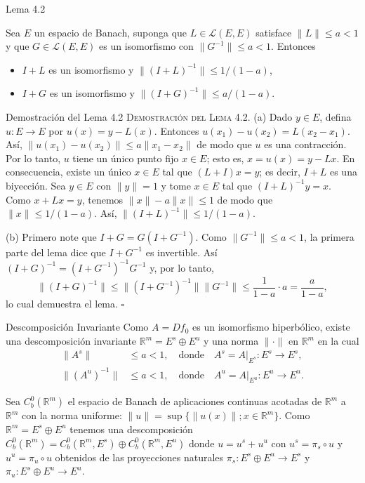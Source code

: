 \documentclass[10pt]{beamer}
\begin{document}
	\begin{frame}{Lema 4.2}
		\begin{lemma}[4.2]
			Sea $E$ un espacio de Banach, suponga que $L \in \mathscr{L}(E, E)$ satisface $\|L\| \le a < 1$ y que $G \in \mathscr{L}(E, E)$ es un isomorfismo con $\|G^{-1}\| \le a < 1$. Entonces
			\begin{itemize}
				\item[(a)] $I + L$ es un isomorfismo y $\|(I + L)^{-1}\| \le 1/(1 - a)$,
				\item[(b)] $I + G$ es un isomorfismo y $\|(I + G)^{-1}\| \le a/(1 - a)$.
			\end{itemize}
		\end{lemma}
	\end{frame}
	
	\begin{frame}[allowframebreaks]{Demostración del Lema 4.2}
		\textsc{Demostración del Lema 4.2.} (a) Dado $y \in E$, defina $u: E \to E$ por $u(x) = y - L(x)$. Entonces $u(x_1) - u(x_2) = L(x_2 - x_1)$. Así, $\|u(x_1) - u(x_2)\| \le a\|x_1 - x_2\|$ de modo que $u$ es una contracción. Por lo tanto, $u$ tiene un único punto fijo $x \in E$; esto es, $x = u(x) = y - Lx$. En consecuencia, existe un único $x \in E$ tal que $(L + I)x = y$; es decir, $I + L$ es una biyección. Sea $y \in E$ con $\|y\| = 1$ y tome $x \in E$ tal que $(I + L)^{-1}y = x$. Como $x + Lx = y$, tenemos $\|x\| - a\|x\| \le 1$ de modo que $\|x\| \le 1/(1 - a)$. Así, $\|(I + L)^{-1}\| \le 1/(1 - a)$.
		
		\framebreak
		
		(b) Primero note que $I + G = G(I + G^{-1})$. Como $\|G^{-1}\| \le a < 1$, la primera parte del lema dice que $I + G^{-1}$ es invertible. Así $(I + G)^{-1} = (I + G^{-1})^{-1}G^{-1}$ y, por lo tanto,
		\[ \|(I + G)^{-1}\| \le \|(I + G^{-1})^{-1}\| \|G^{-1}\| \le \frac{1}{1 - a} \cdot a = \frac{a}{1 - a}, \]
		lo cual demuestra el lema. \hfill $\square$
	\end{frame}
	
	\begin{frame}{Descomposición Invariante}
		Como $A = Df_0$ es un isomorfismo hiperbólico, existe una descomposición invariante $\mathbb{R}^m = E^s \oplus E^u$ y una norma $\|\cdot\|$ en $\mathbb{R}^m$ en la cual
		\begin{align*}
			\|A^s\| &\le a < 1, \quad \text{donde} \quad A^s = A|_{E^s}: E^s \to E^s, \\
			\|(A^u)^{-1}\| &\le a < 1, \quad \text{donde} \quad A^u = A|_{E^u}: E^u \to E^u.
		\end{align*}
		
		Sea $C^0_b(\mathbb{R}^m)$ el espacio de Banach de aplicaciones continuas acotadas de $\mathbb{R}^m$ a $\mathbb{R}^m$ con la norma uniforme: $\|u\| = \sup\{\|u(x)\| ; x \in \mathbb{R}^m\}$. Como $\mathbb{R}^m = E^s \oplus E^u$ tenemos una descomposición $C^0_b(\mathbb{R}^m) = C^0_b(\mathbb{R}^m, E^s) \oplus C^0_b(\mathbb{R}^m, E^u)$ donde $u = u^s + u^u$ con $u^s = \pi_s \circ u$ y $u^u = \pi_u \circ u$ obtenidos de las proyecciones naturales $\pi_s: E^s \oplus E^u \to E^s$ y $\pi_u: E^s \oplus E^u \to E^u$.
	\end{frame}
	
\end{document}
